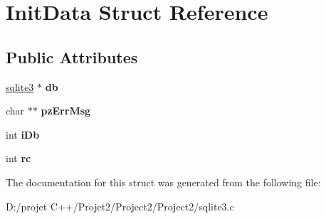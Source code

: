 \hypertarget{struct_init_data}{}\section{Init\+Data Struct Reference}
\label{struct_init_data}
\subsection*{Public Attributes}
\begin{DoxyCompactItemize}
\item 
\mbox{\label{struct_init_data_adc9e29c56e0392076e92d7f4b29fa272}} 
\mbox{\hyperlink{structsqlite3}{sqlite3}} $\ast$ {\bfseries db}
\item 
\mbox{\label{struct_init_data_aa8aef34241ec214f038b38932ffe1357}} 
char $\ast$$\ast$ {\bfseries pz\+Err\+Msg}
\item 
\mbox{\label{struct_init_data_ad6c7953b49d351cd9fb14e3394010689}} 
int {\bfseries i\+Db}
\item 
\mbox{\label{struct_init_data_a627153a3de2c4d159ae44ebc03961592}} 
int {\bfseries rc}
\end{DoxyCompactItemize}


The documentation for this struct was generated from the following file\+:\begin{DoxyCompactItemize}
\item 
D\+:/projet C++/\+Projet2/\+Project2/\+Project2/sqlite3.\+c\end{DoxyCompactItemize}
